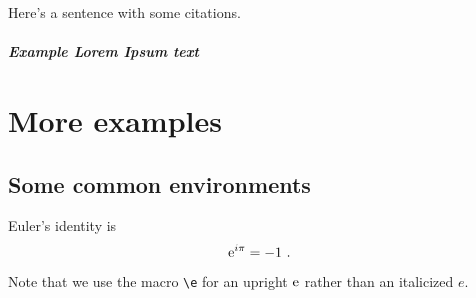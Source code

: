 \documentclass[12pt, oneside]{report}    %
\let\oldchapter\chapter
\def\chapter{%
  \setcounter{sidenote}{1}%
  \oldchapter
}
\begin{document}

Here's a sentence with some citations.\sidenote{
    \scriptsize\lipsum[10]}

\lipsum[1] \lipsum[1]



\paragraph{Example \emph{Lorem Ipsum} text} \lipsum[5]

% 
% 
% 
% 
% 



\chapter{More examples}


\section{Some common environments}

\begin{theorem}
\label{thm:euler:identity}
    Euler's identity is
    \begin{align}
        \operatorname{e}^{i\pi} = -1 \ .
    \end{align}
    Note that we use the macro \verb!\e! for an upright $\operatorname{e}$ rather than an italicized $e$.
\end{theorem}
\end{document}
